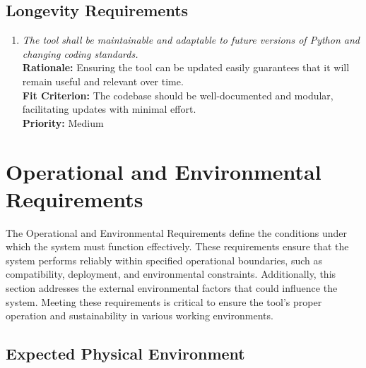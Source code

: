 \documentclass[12pt]{article}
\begin{document}
\subsection{Longevity Requirements}
\begin{enumerate}[label=PR-LR \arabic*., wide=0pt, leftmargin=*]
  \item \emph{The tool shall be maintainable and adaptable to future
    versions of Python and changing coding standards.}\\[2mm]
    {\bf Rationale:} Ensuring the tool can be updated easily
    guarantees that it will remain useful and relevant over time.\\
    {\bf Fit Criterion:} The codebase should be well-documented and
    modular, facilitating updates with minimal effort.\\
    {\bf Priority:} Medium
\end{enumerate}

\section{Operational and Environmental Requirements}

The Operational and Environmental Requirements define the conditions
under which the system must function effectively. These requirements
ensure that the system performs reliably within specified operational
boundaries, such as compatibility, deployment, and environmental
constraints. Additionally, this section addresses the external
environmental factors that could influence the system. Meeting these
requirements is critical to ensure the tool’s proper operation and
sustainability in various working environments.

\subsection{Expected Physical Environment}
\end{document}
